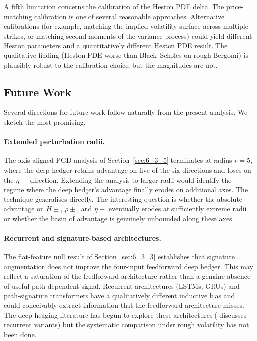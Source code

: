 \documentclass[12pt,a4paper]{article}
\theoremstyle{definition}
\theoremstyle{plain}
\theoremstyle{remark}
\theoremstyle{plain}
\begin{document}
A fifth limitation concerns the calibration of the Heston PDE delta.
The price-matching calibration is one of several reasonable
approaches. Alternative calibrations (for example, matching the
implied volatility surface across multiple strikes, or matching
second moments of the variance process) could yield different
Heston parameters and a quantitatively different Heston PDE result.
The qualitative finding (Heston PDE worse than Black--Scholes on
rough Bergomi) is plausibly robust to the calibration choice, but
the magnitudes are not.

\subsection{Future Work}
\label{sec:7_5_future}

Several directions for future work follow naturally from the present
analysis. We sketch the most promising.

\paragraph{Extended perturbation radii.}
The axis-aligned PGD analysis of Section~\ref{sec:6_3_5} terminates
at radius $r = 5$, where the deep hedger retains advantage on five
of the six directions and loses on the $\eta-$ direction. Extending
the analysis to larger radii would identify the regime where the
deep hedger's advantage finally erodes on additional axes. The
technique generalises directly. The interesting question is whether
the absolute advantage on $H\pm$, $\rho\pm$, and $\eta+$ eventually
erodes at sufficiently extreme radii or whether the basin of
advantage is genuinely unbounded along these axes.

\paragraph{Recurrent and signature-based architectures.}
The flat-feature null result of Section~\ref{sec:6_3_3} establishes
that signature augmentation does not improve the four-input
feedforward deep hedger. This may reflect a saturation of the
feedforward architecture rather than a genuine absence of useful
path-dependent signal. Recurrent architectures (LSTMs, GRUs) and
path-signature transformers have a qualitatively different inductive
bias and could conceivably extract information that the feedforward
architecture misses. The deep-hedging literature has begun to
explore these architectures (\cite{Buehler2019DeepHedging} discusses
recurrent variants) but the systematic comparison under rough
volatility has not been done.
\end{document}
